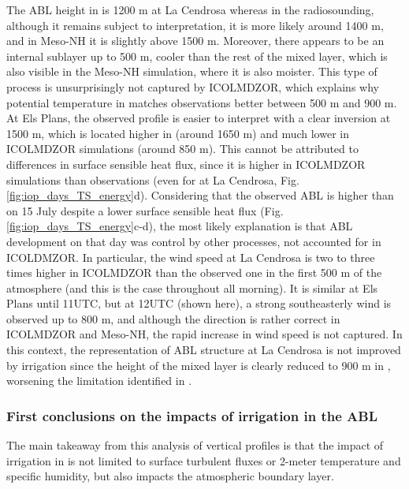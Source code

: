 The ABL height in \noirr is 1200 m at La Cendrosa whereas in the radiosounding, although it remains subject to interpretation, it is more likely around 1400 m, and in Meso-NH it is slightly above 1500 m.
Moreover, there appears to be an internal sublayer up to 500 m, cooler than the rest of the mixed layer, which is also visible in the Meso-NH simulation, where it is also moister. This type of process is unsurprisingly not captured by ICOLMDZOR, which explains why potential temperature in \irrboost matches observations better between 500 m and 900 m.
At Els Plans, the observed profile is easier to interpret with a clear inversion at 1500 m, which is located higher in \mesoexact (around 1650 m) and much lower in ICOLMDZOR simulations (around 850 m).
This cannot be attributed to differences in surface sensible heat flux, since it is higher in ICOLMDZOR simulations than observations (even for \irrboost at La Cendrosa, Fig. \ref{fig:iop_days_TS_energy}d).
Considering that the observed ABL is higher than on 15 July despite a lower surface sensible heat flux (Fig. \ref{fig:iop_days_TS_energy}c-d), the most likely explanation is that ABL development on that day was control by other processes, not accounted for in ICOLDMZOR.
In particular, the wind speed at La Cendrosa is two to three times higher in ICOLMDZOR than the observed one in the first 500 m of the atmosphere (and this is the case throughout all morning). %
It is similar at Els Plans until 11UTC, but at 12UTC (shown here), a strong southeasterly wind is observed up to 800 m, and although the direction is rather correct in ICOLMDZOR and Meso-NH, the rapid increase in wind speed is not captured.
In this context, the representation of ABL structure at La Cendrosa is not improved by irrigation since the height of the mixed layer is clearly reduced to 900 m in \irrboost, worsening the limitation identified in \noirr.

\subsubsection*{First conclusions on the impacts of irrigation in the ABL}

The main takeaway from this analysis of vertical profiles is that the impact of irrigation in \irrboost is not limited to surface turbulent fluxes or 2-meter temperature and specific humidity, but also impacts the atmospheric boundary layer.

